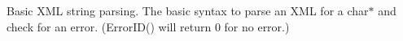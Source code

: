  Basic X\+ML string parsing. The basic syntax to parse an X\+ML for a char$\ast$ and check for an error. (Error\+I\+D() will return 0 for no error.) 
\begin{DoxyCodeInclude}{0}

\end{DoxyCodeInclude}
 